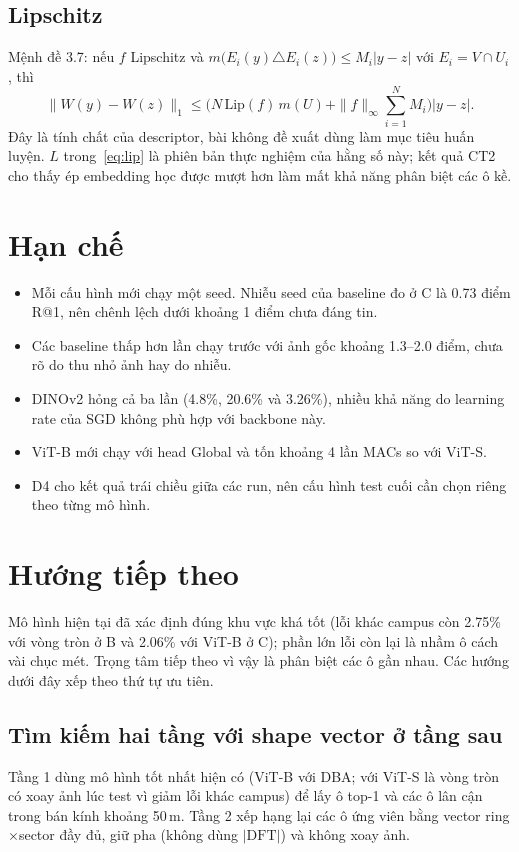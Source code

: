 \documentclass[11pt,a4paper]{article}
\begin{document}
\subsection{Lipschitz}
Mệnh đề 3.7: nếu $f$ Lipschitz và $m\big(E_i(y)\triangle E_i(z)\big)\le M_i|y-z|$ với $E_i=V\cap U_i$, thì
\[
\|W(y)-W(z)\|_1\le\Big(N\,\mathrm{Lip}(f)\,m(U)+\|f\|_\infty\sum_{i=1}^N M_i\Big)|y-z|.
\]
Đây là tính chất của descriptor, bài không đề xuất dùng làm mục tiêu huấn luyện. $\hat L$ trong~\eqref{eq:lip} là phiên bản thực nghiệm của hằng số này; kết quả CT2 cho thấy ép embedding học được mượt hơn làm mất khả năng phân biệt các ô kề.

\section{Hạn chế}
\begin{itemize}
\item Mỗi cấu hình mới chạy một seed. Nhiễu seed của baseline đo ở C là 0.73 điểm R@1, nên chênh lệch dưới khoảng 1 điểm chưa đáng tin.
\item Các baseline thấp hơn lần chạy trước với ảnh gốc khoảng 1.3--2.0 điểm, chưa rõ do thu nhỏ ảnh hay do nhiễu.
\item DINOv2 hỏng cả ba lần (4.8\%, 20.6\% và 3.26\%), nhiều khả năng do learning rate của SGD không phù hợp với backbone này.
\item ViT-B mới chạy với head Global và tốn khoảng 4 lần MACs so với ViT-S.
\item D4 cho kết quả trái chiều giữa các run, nên cấu hình test cuối cần chọn riêng theo từng mô hình.
\end{itemize}

\section{Hướng tiếp theo}\label{sec:huongdi}
Mô hình hiện tại đã xác định đúng khu vực khá tốt (lỗi khác campus còn 2.75\% với vòng tròn ở B và 2.06\% với ViT-B ở C); phần lớn lỗi còn lại là nhầm ô cách vài chục mét. Trọng tâm tiếp theo vì vậy là phân biệt các ô gần nhau. Các hướng dưới đây xếp theo thứ tự ưu tiên.

\subsection{Tìm kiếm hai tầng với shape vector ở tầng sau}
Tầng 1 dùng mô hình tốt nhất hiện có (ViT-B với DBA; với ViT-S là vòng tròn có xoay ảnh lúc test vì giảm lỗi khác campus) để lấy ô top-1 và các ô lân cận trong bán kính khoảng 50\,m. Tầng 2 xếp hạng lại các ô ứng viên bằng vector ring$\times$sector đầy đủ, giữ pha (không dùng $|\mathrm{DFT}|$) và không xoay ảnh.
\end{document}
